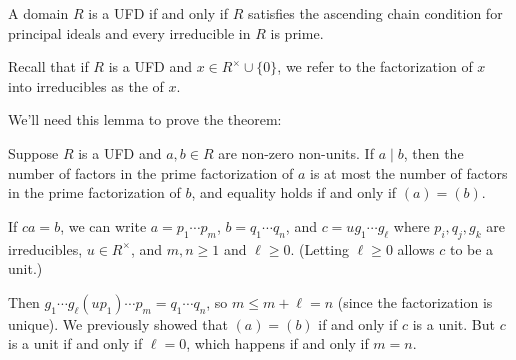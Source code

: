 \documentclass[12pt,letterpaper]{report}
\begin{document}
\begin{thm}{}{}
  A domain $R$ is a UFD if and only if $R$ satisfies the ascending chain condition for principal
  ideals and every irreducible in $R$ is prime.
\end{thm}

Recall that if $R$ is a UFD and $x \in R^\times \cup \{0\}$, we refer to the factorization of $x$
into irreducibles as the  of $x$.

We'll need this lemma to prove the theorem:

\begin{lem}{}{}
  Suppose $R$ is a UFD and $a, b \in R$ are non-zero non-units.
  If $a \mid b$, then the number of factors in the prime factorization of $a$ is at most the
  number of factors in the prime factorization of $b$, and equality holds if and only if
  $(a) = (b)$.
\end{lem}

\begin{thmproof}
  If $ca = b$, we can write $a = p_1 \cdots p_m$, $b = q_1 \cdots q_n$, and $c = ug_1 \cdots g_\ell$
  where $p_i, q_j, g_k$ are irreducibles, $u \in R^\times$, and $m, n \geq 1$ and $\ell \geq 0$.
  (Letting $\ell \geq 0$ allows $c$ to be a unit.)

  Then $g_1 \cdots g_\ell (up_1) \cdots p_m = q_1 \cdots q_n$, so $m \leq m + \ell = n$ (since the
  factorization is unique).
  We previously showed that $(a) = (b)$ if and only if $c$ is a unit.
  But $c$ is a unit if and only if $\ell = 0$, which happens if and only if $m = n$.
\end{thmproof}
\end{document}

